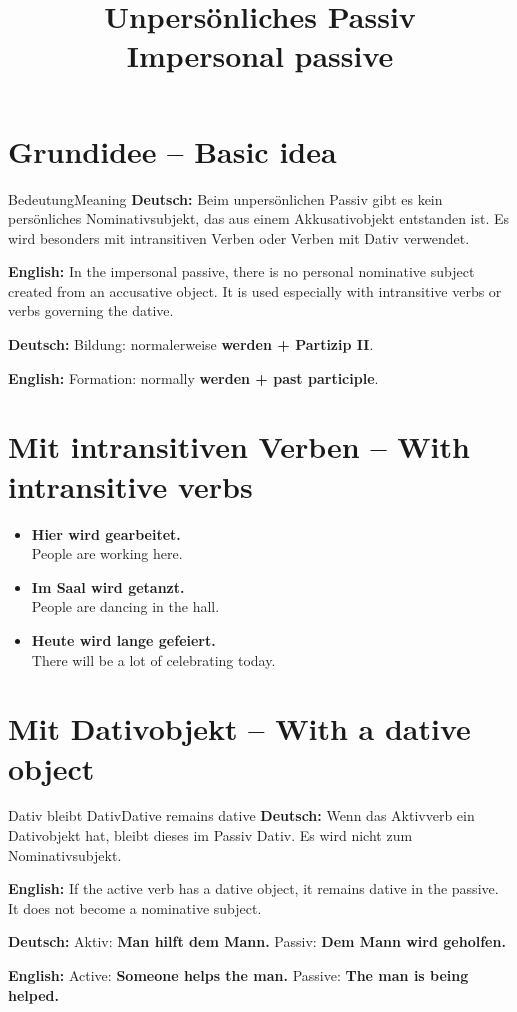\documentclass[a4paper,11pt]{article}
\title{Unpersönliches Passiv\\[0.3em]\large\textnormal{Impersonal passive}}
\date{}
\newcommand{\GermanText}[1]{\textbf{Deutsch: }#1\par}
\newcommand{\EnglishText}[1]{{\small\color{SoftGray}\textbf{English: }#1\par}}
\newcommand{\ExampleItem}[2]{\item \textbf{#1}\\{\small\color{SoftGray}#2}}
\begin{document}
\maketitle
\tableofcontents
\newpage

\section{Grundidee -- Basic idea}
\begin{grammarentry}{Bedeutung}{Meaning}
\GermanText{Beim unpersönlichen Passiv gibt es kein persönliches Nominativsubjekt, das aus einem Akkusativobjekt entstanden ist. Es wird besonders mit intransitiven Verben oder Verben mit Dativ verwendet.}
\EnglishText{In the impersonal passive, there is no personal nominative subject created from an accusative object. It is used especially with intransitive verbs or verbs governing the dative.}
\GermanText{Bildung: normalerweise \textbf{werden + Partizip II}.}
\EnglishText{Formation: normally \textbf{werden + past participle}.}
\end{grammarentry}

\section{Mit intransitiven Verben -- With intransitive verbs}
\begin{exbox}\begin{itemize}
\ExampleItem{Hier wird gearbeitet.}{People are working here.}
\ExampleItem{Im Saal wird getanzt.}{People are dancing in the hall.}
\ExampleItem{Heute wird lange gefeiert.}{There will be a lot of celebrating today.}
\end{itemize}\end{exbox}

\section{Mit Dativobjekt -- With a dative object}
\begin{grammarentry}{Dativ bleibt Dativ}{Dative remains dative}
\GermanText{Wenn das Aktivverb ein Dativobjekt hat, bleibt dieses im Passiv Dativ. Es wird nicht zum Nominativsubjekt.}
\EnglishText{If the active verb has a dative object, it remains dative in the passive. It does not become a nominative subject.}
\GermanText{Aktiv: \textbf{Man hilft dem Mann.} Passiv: \textbf{Dem Mann wird geholfen.}}
\EnglishText{Active: \textbf{Someone helps the man.} Passive: \textbf{The man is being helped.}}
\end{grammarentry}
\end{document}
